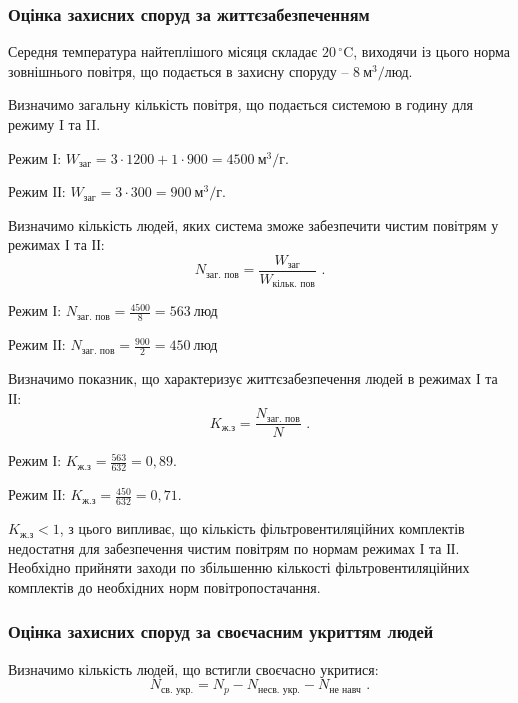 \documentclass[a4paper,ukrainian,utf8,nocolumnsxix,floatsection,equationsection]{eskdtext}
\renewcommand\paragraph{\subsubsection}
\begin{document}
\paragraph{Оцінка захисних споруд за життєзабезпеченням}

Середня температура найтеплішого місяця складає $20\,^{\circ}\mathrm{C}$, виходячи із цього норма зовнішнього повітря, що подається в захисну споруду – $8\:\text{м}^3/\text{люд}$.

Визначимо загальну кількість повітря, що подається системою в годину для режиму I та II.

Режим І: $W_\text{заг} = 3 \cdot 1200 + 1 \cdot 900 = 4500 \:\text{м}^3/\text{г}$.

Режим ІІ: $W_\text{заг} = 3 \cdot 300 = 900 \:\text{м}^3/\text{г}$.

Визначимо кількість людей, яких система зможе забезпечити чистим повітрям у режимах І та ІІ:
\begin{equation}
	N_\text{заг. пов} = \frac{W_\text{заг}}{W_\text{кільк. пов}} \text{ .}
\end{equation}

Режим І: $N_\text{заг. пов} = \frac{4500}{8} = 563 \:\text{люд}$

Режим ІІ: $N_\text{заг. пов} = \frac{900}{2} = 450 \:\text{люд}$

Визначимо показник, що характеризує життєзабезпечення людей в режимах І та ІІ:
\begin{equation}
	K_\text{ж.з} = \frac{N_\text{заг. пов}}{N} \text{ .}
\end{equation}

Режим І: $K_\text{ж.з} = \frac{563}{632} = 0,89$.

Режим ІІ: $K_\text{ж.з} = \frac{450}{632} = 0,71$.

$K_\text{ж.з} < 1$, з цього випливає, що кількість фільтровентиляційних комплектів недостатня для забезпечення чистим повітрям по нормам режимах І та ІІ. Необхідно прийняти заходи по збільшенню кількості фільтровентиляційних комплектів до необхідних норм повітропостачання.

\paragraph{Оцінка захисних споруд за своєчасним укриттям людей}

Визначимо кількість людей, що встигли своєчасно укритися:
\begin{equation}
	N_\text{св. укр.} = N_p - N_\text{несв. укр.} - N_\text{не навч} \text{ .}
\end{equation}
\end{document}
